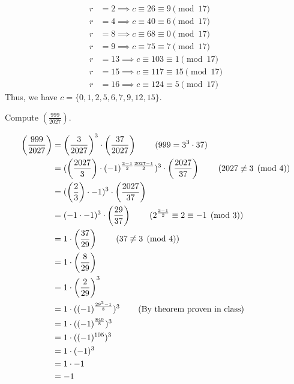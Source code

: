 \documentclass{article}
\newcommand{\legendre}[2]{\left(\frac{#1}{#2}\right)}
\begin{document}
\begin{solution}{}{}
\begin{align*}
        r&=2\implies c\equiv26\equiv9\pmod{17}\\
        r&=4\implies c\equiv40\equiv6\pmod{17}\\
        r&=8\implies c\equiv68\equiv0\pmod{17}\\
        r&=9\implies c\equiv75\equiv7\pmod{17}\\
        r&=13\implies c\equiv103\equiv1\pmod{17}\\
        r&=15\implies c\equiv117\equiv15\pmod{17}\\
        r&=16\implies c\equiv124\equiv5\pmod{17}
    \end{align*}
    Thus, we have $c=\{0,1,2,5,6,7,9,12,15\}$.
\end{solution}

\begin{problem}{}{}
    Compute $\left(\frac{999}{2027}\right)$.
\end{problem}
\begin{solution}{}{}
    \begin{align*}
        \legendre{999}{2027}&=\legendre{3}{2027}^3\cdot\legendre{37}{2027} \hspace{0.3in}(999=3^3\cdot37)\\
        &=(\legendre{2027}{3}\cdot(-1)^{\frac{3-1}{2}\frac{2027-1}{2}})^3\cdot\legendre{2027}{37} \hspace{0.3in}(2027\not\equiv3\pmod{4})\\
        &=(\legendre{2}{3}\cdot-1)^3\cdot\legendre{2027}{37}\\
        &=(-1\cdot-1)^3\cdot\legendre{29}{37} \hspace{0.3in}(2^{\frac{3-1}{2}}\equiv2\equiv-1\pmod{3})\\
        &=1\cdot\legendre{37}{29} \hspace{0.3in}(37\not\equiv3\pmod{4})\\
        &=1\cdot\legendre{8}{29}\\
        &=1\cdot\legendre{2}{29}^3\\
        &=1\cdot((-1)^{\frac{29^2-1}{8}})^3 \hspace{0.3in}(\text{By theorem proven in class})\\
        &=1\cdot((-1)^{\frac{840}{8}})^3\\
        &=1\cdot((-1)^{105})^3\\
        &=1\cdot(-1)^3\\
        &=1\cdot-1\\
        &=-1
    \end{align*}
\end{solution}
\end{document}
